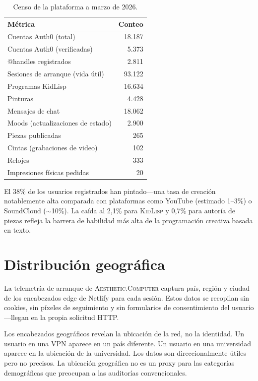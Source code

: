 \documentclass[10pt,letterpaper,twocolumn]{article}
\newcommand{\ac}{\textsc{Aesthetic.Computer}}
\newcommand{\kl}{\textsc{KidLisp}}
\begin{document}
\begin{table}[h]
\small
\centering
\begin{tabularx}{\columnwidth}{Xr}
\toprule
\textbf{Métrica} & \textbf{Conteo} \\
\midrule
Cuentas Auth0 (total) & 18.187 \\
Cuentas Auth0 (verificadas) & 5.373 \\
@handles registrados & 2.811 \\
Sesiones de arranque (vida útil) & 93.122 \\
\midrule
Programas KidLisp & 16.634 \\
Pinturas & 4.428 \\
Mensajes de chat & 18.062 \\
Moods (actualizaciones de estado) & 2.900 \\
Piezas publicadas & 265 \\
Cintas (grabaciones de video) & 102 \\
Relojes & 333 \\
Impresiones físicas pedidas & 20 \\
\bottomrule
\end{tabularx}
\caption{Censo de la plataforma a marzo de 2026.}
\label{tab:census}
\end{table}

El 38\% de los usuarios registrados han pintado---una tasa de creación notablemente alta comparada con plataformas como YouTube (estimado 1--3\%) o SoundCloud ($\sim$10\%). La caída al 2,1\% para \kl{} y 0,7\% para autoría de piezas refleja la barrera de habilidad más alta de la programación creativa basada en texto.

\section{Distribución geográfica}

La telemetría de arranque de \ac{} captura país, región y ciudad de los encabezados edge de Netlify para cada sesión. Estos datos se recopilan sin cookies, sin píxeles de seguimiento y sin formularios de consentimiento del usuario---llegan en la propia solicitud HTTP.

Los encabezados geográficos revelan la ubicación de la red, no la identidad. Un usuario en una VPN aparece en un país diferente. Un usuario en una universidad aparece en la ubicación de la universidad. Los datos son direccionalmente útiles pero no precisos. La ubicación geográfica no es un proxy para las categorías demográficas que preocupan a las auditorías convencionales.
\end{document}
